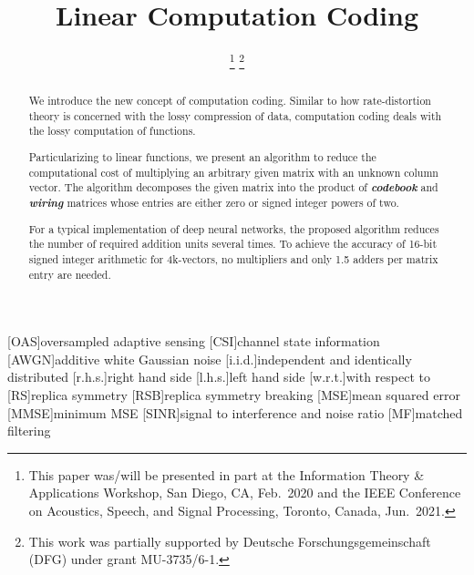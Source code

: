 \documentclass[twocolumn]{IEEEtran}
\begin{document}
\title{Linear Computation Coding}
%
\author{
\thanks{This paper was/will be presented in part at the Information Theory \& Applications Workshop, San Diego, CA, Feb.\ 2020 and the IEEE Conference on Acoustics, Speech, and Signal Processing, Toronto, Canada, Jun.\ 2021.}
\thanks{This work was partially supported by Deutsche Forschungsgemeinschaft (DFG) under grant MU-3735/6-1.}
}
\IEEEoverridecommandlockouts
%
\maketitle

\begin{acronym}
[OAS]{oversampled adaptive sensing}
[CSI]{channel state information}
[AWGN]{additive white Gaussian noise}
[i.i.d.]{independent and identically distributed}
[r.h.s.]{right hand side}
[l.h.s.]{left hand side}
[w.r.t.]{with respect to}
[RS]{replica symmetry}
[RSB]{replica symmetry breaking}
[MSE]{mean squared error}
[MMSE]{minimum MSE}
[SINR]{signal to interference and noise ratio}
[MF]{matched filtering}
\end{acronym}
\begin{abstract}

We introduce the new concept of computation coding. Similar to how rate-distortion theory is concerned with the lossy compression of data, computation coding deals with the lossy computation of functions.

Particularizing to linear functions, we present an algorithm to reduce the computational cost of multiplying an arbitrary given matrix with an unknown column vector.
The algorithm decomposes the given matrix into the product of \textbf{\textit{codebook}} and \textbf{\textit{wiring}} matrices whose entries are either zero or signed integer powers of two.

For a typical implementation of deep neural networks, the proposed algorithm reduces the number of required addition units several times. To achieve the accuracy of 16-bit signed integer arithmetic for 4k-vectors, no multipliers and only 1.5 adders per matrix entry are needed. 
\end{abstract}
\end{document}
